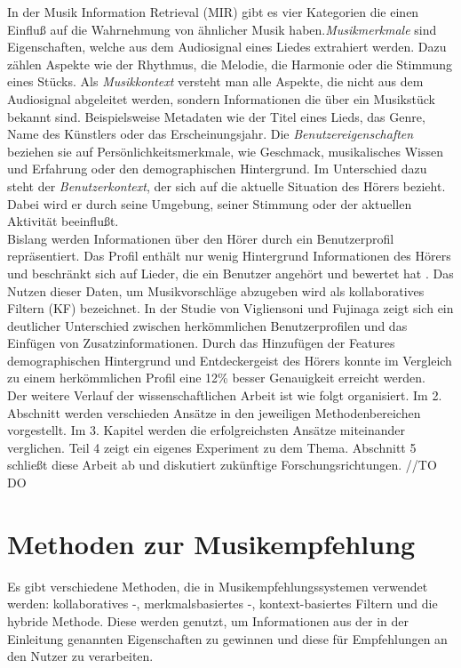 \documentclass[twosided,a4,10pt]{article}
\begin{document}
\begin{multicols}{2}
		In der Musik Information Retrieval (MIR) gibt es vier Kategorien \cite{schedl} die einen Einfluß auf die Wahrnehmung von ähnlicher Musik haben.\newline \textit{Musikmerkmale} sind Eigenschaften, welche aus dem Audiosignal eines Liedes extrahiert werden. Dazu zählen Aspekte wie der Rhythmus, die Melodie, die Harmonie oder die Stimmung eines Stücks.\newline
		Als \textit{Musikkontext} versteht man alle Aspekte, die nicht aus dem Audiosignal abgeleitet werden, sondern Informationen die über ein Musikstück bekannt sind. Beispielsweise Metadaten wie der Titel eines Lieds, das Genre, Name des Künstlers oder das Erscheinungsjahr.\newline
		Die \textit{Benutzereigenschaften} beziehen sie auf Persönlichkeitsmerkmale, wie Geschmack, musikalisches Wissen und Erfahrung oder den demographischen Hintergrund.\newline
		Im Unterschied dazu steht der \textit{Benutzerkontext}, der sich auf die aktuelle Situation des Hörers bezieht. Dabei wird er durch seine Umgebung, seiner Stimmung oder der aktuellen Aktivität beeinflußt. \cite{knees}\newline\\
		Bislang werden Informationen über den Hörer durch ein Benutzerprofil repräsentiert. Das Profil enthält nur wenig Hintergrund Informationen des Hörers und beschränkt sich auf Lieder, die ein Benutzer angehört und bewertet hat \cite{oord}. Das Nutzen dieser Daten, um Musikvorschläge abzugeben wird als kollaboratives Filtern (KF) bezeichnet. In der Studie von Vigliensoni und Fujinaga \cite{vigliensoni} zeigt sich ein deutlicher Unterschied zwischen herkömmlichen Benutzerprofilen und das Einfügen von Zusatzinformationen. Durch das Hinzufügen der Features demographischen Hintergrund und Entdeckergeist des Hörers konnte im Vergleich zu einem herkömmlichen Profil eine 12\% besser Genauigkeit erreicht werden.\newline\\
		Der weitere Verlauf der wissenschaftlichen Arbeit ist wie folgt organisiert. Im 2. Abschnitt werden verschieden Ansätze in den jeweiligen Methodenbereichen vorgestellt. Im 3. Kapitel werden die erfolgreichsten Ansätze miteinander verglichen. Teil 4 zeigt ein eigenes Experiment zu dem Thema. Abschnitt 5 schließt diese Arbeit ab und diskutiert zukünftige Forschungsrichtungen. //TO DO
		
		\section{Methoden zur Musikempfehlung}
		Es gibt verschiedene Methoden, die in Musikempfehlungssystemen verwendet werden: kollaboratives -, merkmalsbasiertes -, kontext-basiertes Filtern und die hybride Methode. Diese werden genutzt, um Informationen aus der in der Einleitung genannten Eigenschaften zu gewinnen und diese für Empfehlungen an den Nutzer zu verarbeiten. \cite{wang}
	

\end{multicols}
\end{document}
